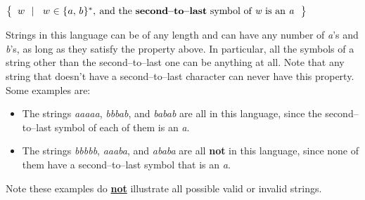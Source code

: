 \documentclass[11pt]{article}
\newcommand{\sms}{\ensuremath{\hspace{.1mm}}}
\begin{document}
\begin{enumerate}
          \vspace{-2mm}

          \begin{centering}

            \(
              \left\{
                \ \:
                \begin{array}[c]{@{}l}
                w
                \end{array}
                \left| \ \ \:
                w \sms \in \sms \{ \sms a, \, b \sms \}^*, \:
                \textrm{and the \textbf{second--to--last} symbol of
                        \emph{w} is an \emph{a}}
              \ \:
              \right.
              \right\}
            \)

            \vspace{1.25mm}

          \end{centering}

          Strings in this language can be of any length and can have any
          number of \emph{a}'s and \emph{b}'s, as long as they satisfy the
          property above.  In particular, all the symbols of a string other
          than the second--to--last one can be anything at all.  Note that
          any string that doesn't have a second--to--last character can
          never have this property.  Some examples are:

          \vspace{-2.75mm}

          \begin{itemize}

            \addtolength{\itemsep}{-.5mm}

            \item The strings \emph{aaaaa}, \emph{bbbab}, and \emph{babab}
                  are all in this language, since the second--to--last
                  symbol of each of them is an \emph{a}.

            \item The strings \emph{bbbbb}, \emph{aaaba}, and \emph{ababa}
                  are all \textbf{not} in this language, since none of them
                  have a second--to--last symbol that is an \emph{a}.

          \end{itemize}

          \vspace{-2.5mm}

          Note these examples do \textbf{\underline{not}} illustrate all
          possible valid or invalid strings.


\end{enumerate}
\end{document}
